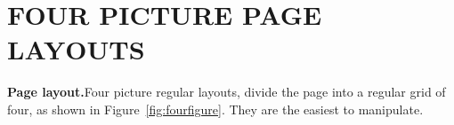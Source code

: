 \chapter{FOUR PICTURE PAGE LAYOUTS}
\setlength{\columnsep}{0pt}
\begin{multicols}{2}
\normalsize
\textbf{Page layout.}\quad Four picture regular layouts, divide the page into a regular grid of four, as shown in Figure~\ref{fig:fourfigure}. They are the easiest to manipulate.
\smallskip
{}
\par
\hspace{-20pt}\begin{minipage}{0.45\textwidth}\par
{}
\label{fig:fourfigure}
\end{minipage}

\medskip

\lipsum
{}
\medskip
\hskip-10pt\begin{minipage}{0.5\textwidth}\par
{}
\label{fig:fourfigure}
\end{minipage}
\smallskip
\end{multicols}
\clearpage
